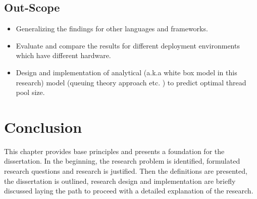 \subsection{Out-Scope}

\begin{itemize}
	\item Generalizing the findings for other languages and frameworks.
	\item Evaluate and compare the results for different deployment environments which have different hardware.
	\item Design and implementation of analytical (a.k.a white box model in this research) model (queuing theory approach etc. ) to predict optimal thread pool size.
\end{itemize}

\section{Conclusion}	

This chapter provides base principles and presents a foundation for the dissertation. In the beginning, the research problem is identified, formulated research questions and research is justified. Then the definitions are presented, the dissertation is outlined, research design and implementation are briefly discussed laying the path to proceed with a detailed explanation of the research.